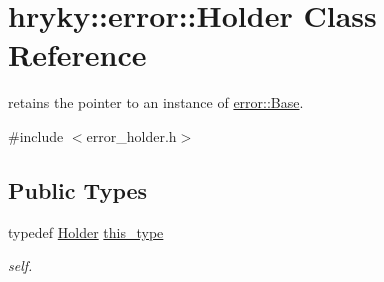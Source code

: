 \hypertarget{classhryky_1_1error_1_1_holder}{\section{hryky\-:\-:error\-:\-:Holder Class Reference}
\label{classhryky_1_1error_1_1_holder}
}


retains the pointer to an instance of \hyperlink{classhryky_1_1error_1_1_base}{error\-::\-Base}.  




{\ttfamily \#include $<$error\-\_\-holder.\-h$>$}

\subsection*{Public Types}
\begin{DoxyCompactItemize}
\item 
\hypertarget{classhryky_1_1error_1_1_holder_a46d720ab7a2ddd82bd62f89fdb1d5c8d}{typedef \hyperlink{classhryky_1_1error_1_1_holder}{Holder} \hyperlink{classhryky_1_1error_1_1_holder_a46d720ab7a2ddd82bd62f89fdb1d5c8d}{this\-\_\-type}}\label{classhryky_1_1error_1_1_holder_a46d720ab7a2ddd82bd62f89fdb1d5c8d}

\begin{DoxyCompactList}\small\item\em self. \end{DoxyCompactList}\end{DoxyCompactItemize}

